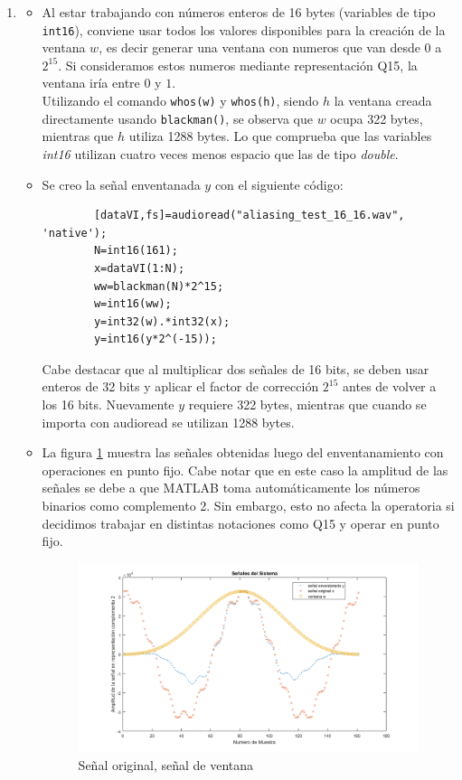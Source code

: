 \documentclass[letterpaper,onecolumn,10pt,journal,final]{IEEEtran}
\begin{document}
\begin{enumerate}[{a)}]
    \item 
    \begin{itemize}
        \item 
        Al estar trabajando con números enteros de 16 bytes (variables de tipo \texttt{int16}), conviene usar todos los valores disponibles para la creación de la ventana $w$, es decir generar una ventana con numeros que van desde $0$ a $2^{15}$. Si consideramos estos numeros mediante representación Q15, la ventana iría entre $0$ y $1$. \\
        Utilizando el comando \texttt{whos(w)} y \texttt{whos(h)}, siendo $h$ la ventana creada directamente usando \texttt{blackman()}, se observa que $w$ ocupa 322 bytes, mientras que $h$ utiliza 1288 bytes. Lo que comprueba que las variables \textit{int16} utilizan cuatro veces menos espacio que las de tipo \textit{double}.
        \item
        Se creo la señal enventanada $y$ con el siguiente código:
        \begin{lstlisting}
        [dataVI,fs]=audioread("aliasing_test_16_16.wav", 'native');
        N=int16(161);
        x=dataVI(1:N);
        ww=blackman(N)*2^15;
        w=int16(ww);
        y=int32(w).*int32(x);
        y=int16(y*2^(-15));
        \end{lstlisting}
        Cabe destacar que al multiplicar dos señales de 16 bits, se deben usar enteros de 32 bits y aplicar el factor de corrección $2^{15}$ antes de volver a los 16 bits.
        Nuevamente $y$ requiere 322 bytes, mientras que cuando se importa con audioread se utilizan 1288 bytes.
        \item
        La figura \ref{VI} muestra las señales obtenidas luego del enventanamiento con operaciones en punto fijo. Cabe notar que en este caso la amplitud de las señales se debe a que MATLAB toma automáticamente los números binarios como complemento 2. Sin embargo, esto no afecta la operatoria si decidimos trabajar en distintas notaciones como Q15 y operar en punto fijo.
        \begin{figure}[H]
            \centering
            \includegraphics[width= 0.8\linewidth]{Figuras/plotVI.png}
            \caption{Señal original, señal de ventana}
            \label{VI}
        \end{figure}
    \end{itemize}
\end{enumerate}
\end{document}
